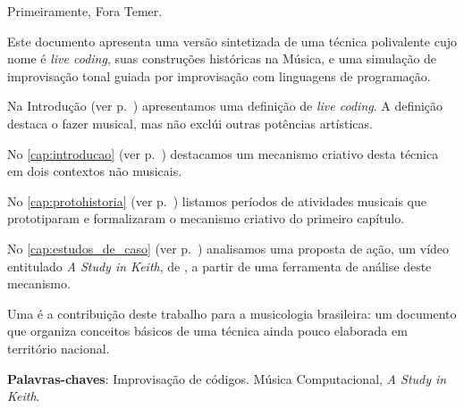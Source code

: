 
\setlength{\absparsep}{18pt} %
\begin{resumo}

Primeiramente, Fora Temer. 

Este documento apresenta uma versão sintetizada de uma técnica polivalente cujo nome é \emph{live coding}, suas construções históricas na Música, e uma simulação de improvisação tonal guiada por improvisação com linguagens de programação.

Na Introdução (ver p.~\pageref{cap:intro}) apresentamos uma definição de \emph{live coding}. A definição destaca o fazer musical, mas não exclúi outras potências artísticas. 

No \autoref{cap:introducao} (ver p.~\pageref{cap:introducao}) destacamos um mecanismo criativo desta técnica em dois contextos não musicais.

No \autoref{cap:protohistoria} (ver p.~\pageref{cap:protohistoria}) listamos  períodos de atividades musicais que prototiparam e formalizaram o mecanismo criativo do primeiro capítulo.

No \autoref{cap:estudos_de_caso} (ver p.~\pageref{cap:estudos_de_caso}) analisamos uma proposta de ação, 
um vídeo entitulado \emph{A Study in Keith}, de , a partir de uma ferramenta de análise deste mecanismo.

Uma é a contribuição deste trabalho para a musicologia brasileira: um documento que organiza conceitos básicos de uma técnica ainda pouco elaborada em território nacional.

\vspace{\onelineskip}
\noindent
\textbf{Palavras-chaves}: Improvisação de códigos. Música Computacional, \emph{A Study in Keith}.
\end{resumo}

